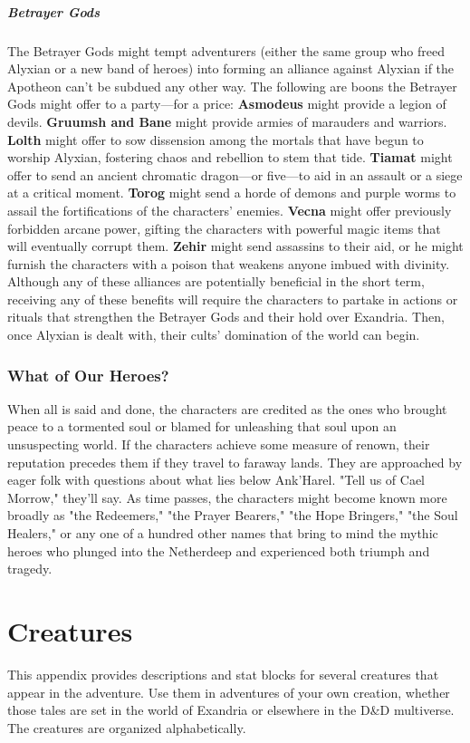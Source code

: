 \documentclass[10pt,a4,twoside,twocolumn,openany,nodeprecatedcode]{dndbook}
\begin{document}
\paragraph{Betrayer Gods}
The Betrayer Gods might tempt adventurers (either the same group who freed Alyxian or a new band of heroes) into forming an alliance against Alyxian if the Apotheon can't be subdued any other way. The following are boons the Betrayer Gods might offer to a party—for a price:
\textbf{Asmodeus} might provide a legion of devils.
\textbf{Gruumsh and Bane} might provide armies of marauders and warriors.
\textbf{Lolth} might offer to sow dissension among the mortals that have begun to worship Alyxian, fostering chaos and rebellion to stem that tide.
\textbf{Tiamat} might offer to send an ancient chromatic dragon—or five—to aid in an assault or a siege at a critical moment.
\textbf{Torog} might send a horde of demons and purple worms to assail the fortifications of the characters' enemies.
\textbf{Vecna} might offer previously forbidden arcane power, gifting the characters with powerful magic items that will eventually corrupt them.
\textbf{Zehir} might send assassins to their aid, or he might furnish the characters with a poison that weakens anyone imbued with divinity.
Although any of these alliances are potentially beneficial in the short term, receiving any of these benefits will require the characters to partake in actions or rituals that strengthen the Betrayer Gods and their hold over Exandria. Then, once Alyxian is dealt with, their cults' domination of the world can begin.
\subsection{What of Our Heroes?}
When all is said and done, the characters are credited as the ones who brought peace to a tormented soul or blamed for unleashing that soul upon an unsuspecting world.
If the characters achieve some measure of renown, their reputation precedes them if they travel to faraway lands. They are approached by eager folk with questions about what lies below Ank'Harel. "Tell us of Cael Morrow," they'll say. As time passes, the characters might become known more broadly as "the Redeemers," "the Prayer Bearers," "the Hope Bringers," "the Soul Healers," or any one of a hundred other names that bring to mind the mythic heroes who plunged into the Netherdeep and experienced both triumph and tragedy.
\appendix
\chapter{Creatures}
This appendix provides descriptions and stat blocks for several creatures that appear in the adventure. Use them in adventures of your own creation, whether those tales are set in the world of Exandria or elsewhere in the D\&D multiverse.
The creatures are organized alphabetically.
\end{document}
